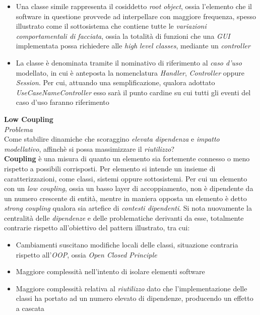 \documentclass{article}
\begin{document}
\begin{itemize}[label={-}]
    \itemsep0em
    \item Una classe simile rappresenta il cosiddetto \textit{root object}, ossia l'elemento che il software in questione provvede ad interpellare con maggiore frequenza, spesso illustrato come il sottosistema che contiene tutte le \textit{variazioni comportamentali di facciata}, ossia la totalità di funzioni che una \textit{GUI} implementata possa richiedere alle \textit{high level classes}, mediante un \textit{controller}
    \item La classe è denominata tramite il nominativo di riferimento al \textit{caso d'uso} modellato, in cui è anteposta la nomenclatura \textit{Handler}, \textit{Controller} oppure \textit{Session}. Per cui, attuando una semplificazione, qualora adottato \textit{UseCaseNameController} esso sarà il punto cardine su cui tutti gli eventi del caso d'uso faranno riferimento
\end{itemize}\vspace*{7pt}
\textbf{Low Coupling}\vspace*{7pt}\\
\textit{Problema}\\
Come stabilire dinamiche che scoraggino \textit{elevata dipendenza} e \textit{impatto modellativo}, affinchè si possa massimizzare il \textit{riutilizzo}?\vspace*{7pt}\\
\textbf{Coupling} è una misura di quanto un elemento sia fortemente connesso o meno rispetto a possibili corrisposti. Per elemento si intende un insieme di caratterizzazioni, come classi, sistemi oppure sottosistemi. Per cui un elemento con un \textit{low coupling}, ossia un basso layer di accoppiamento, non è dipendente da un numero crescente di entità, mentre in maniera opposta un elemento è detto \textit{strong coupling} qualora sia artefice di \textit{contesti dipendenti}. Si nota nuovamente la centralità delle \textit{dipendenze} e delle problematiche derivanti da esse, totalmente contrarie rispetto all'obiettivo del pattern illustrato, tra cui:
\begin{itemize}[label={-}]
    \itemsep0em
    \item Cambiamenti suscitano modifiche locali delle classi, situazione contraria rispetto all'\textit{OOP}, ossia \textit{Open Closed Principle}
    \item Maggiore complessità nell'intento di isolare elementi software
    \item Maggiore complessità relativa al \textit{riutilizzo} dato che l'implementazione delle classi ha portato ad un numero elevato di dipendenze, producendo un effetto a cascata
\end{itemize}\vspace*{7pt}
\end{document}
